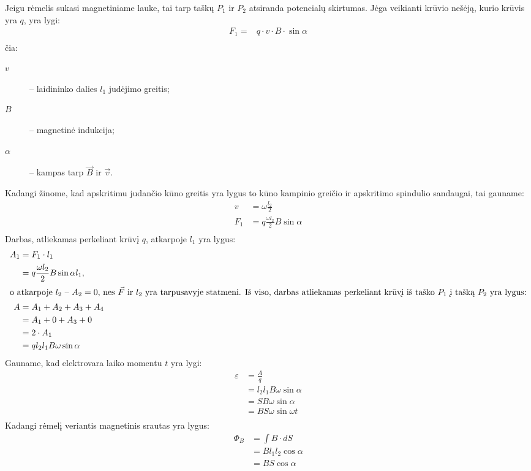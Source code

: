 Jeigu rėmelis sukasi magnetiniame lauke, tai tarp taškų $P_{1}$ ir
$P_{2}$ atsiranda potencialų skirtumas. Jėga veikianti krūvio nešėją,
kurio krūvis yra $q$, yra lygi:
\begin{align*}
  F_{1} =& q \cdot v \cdot B \cdot \sin \alpha \\
\end{align*}
čia:
\begin{description}
  \item[$v$] – laidininko dalies $l_{1}$ judėjimo greitis;
  \item[$B$] – magnetinė indukcija;
  \item[$\alpha$] – kampas tarp $\vec{B}$ ir $\vec{v}$.
\end{description}
Kadangi žinome, kad apskritimu judančio kūno greitis yra lygus to
kūno kampinio greičio ir apskritimo spindulio sandaugai, tai gauname:
\begin{align*}
  v &= \omega \frac{l_{2}}{2} \\
  F_{1} &= q \frac{\omega l_{2}}{2} B \sin \alpha \\
\end{align*}
Darbas, atliekamas perkeliant krūvį $q$, atkarpoje $l_{1}$ yra lygus:
\begin{align*}
  A_{1}
  &= F_{1} \cdot l_{1} \\
  &= q \frac{\omega l_{2}}{2} B \sin \alpha l_{1}, \\
  \intertext{o atkarpoje $l_{2}$ – $A_{2} = 0$, nes $\vec{F}$ ir $l_{2}$
  yra tarpusavyje statmeni. Iš viso, darbas atliekamas perkeliant krūvį
  iš taško $P_{1}$ į tašką $P_{2}$ yra lygus:}
  A
  &= A_{1} + A_{2} + A_{3} + A_{4} \\
  &= A_{1} + 0 + A_{3} + 0 \\
  &= 2 \cdot A_{1} \\
  &= q l_{2} l_{1} B \omega \sin \alpha \\
\end{align*}
Gauname, kad elektrovara laiko momentu $t$ yra lygi:
\begin{align*}
  \varepsilon
  &= \frac{A}{q} \\
  &= l_{2} l_{1} B \omega \sin \alpha \\
  &= S B \omega \sin \alpha \\
  &= B S \omega \sin \omega t \\
\end{align*}
Kadangi rėmelį veriantis magnetinis srautas yra lygus:
\begin{align*}
  \Phi_{B}
  &= \int B \cdot d S \\
  &= B l_{1} l_{2} \cos \alpha \\
  &= B S \cos \alpha \\
\end{align*}
